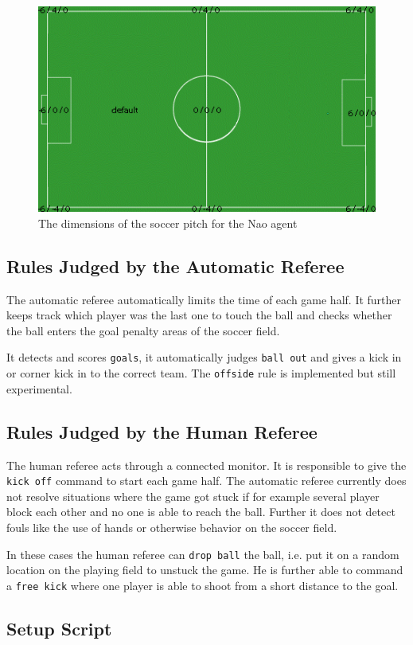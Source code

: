 \begin{figure}[htp]
  \centering
  \includegraphics[width=\textwidth]{fig/pitchNao}
  \caption{The dimensions of the soccer pitch for the Nao agent}
  \label{fig:pitchNao}
\end{figure}

\subsection{Rules Judged by the Automatic Referee}

The automatic referee automatically limits the time of each game
half. It further keeps track which player was the last one to touch
the ball and checks whether the ball enters the goal penalty areas of
the soccer field. 

It detects and scores \texttt{goals}, it automatically judges
\texttt{ball out} and gives a kick in or corner kick in to the correct team. 
The \texttt{offside} rule is implemented but still experimental.

\subsection{Rules Judged by the Human Referee}

The human referee acts through a connected monitor. It is responsible
to give the \texttt{kick off} command to start each game half. The
automatic referee currently does not resolve situations where the game
got stuck if for example several player block each other and no one is
able to reach the ball. Further it does not detect fouls like the use
of hands or otherwise behavior on the soccer field.

In these cases the human referee can \texttt{drop ball} the ball,
i.e. put it on a random location on the playing field to unstuck the
game. He is further able to command a \texttt{free kick} where one
player is able to shoot from a short distance to the goal.

\subsection{Setup Script}



